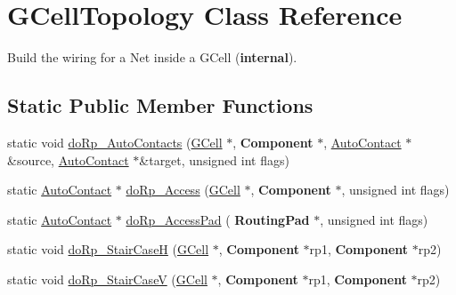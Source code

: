 \hypertarget{classanonymous__namespace_02LoadGrByNet_8cpp_03_1_1GCellTopology}{}\section{G\+Cell\+Topology Class Reference}
\label{classanonymous__namespace_02LoadGrByNet_8cpp_03_1_1GCellTopology}


Build the wiring for a Net inside a G\+Cell ({\bfseries internal}).  


\subsection*{Static Public Member Functions}
\begin{DoxyCompactItemize}
\item 
static void \mbox{\hyperlink{group__LoadGlobalRouting_gae9cae408ea16a3f7c77c3d75f0242f19}{do\+Rp\+\_\+\+Auto\+Contacts}} (\mbox{\hyperlink{classKatabatic_1_1GCell}{G\+Cell}} $\ast$, \textbf{ Component} $\ast$, \mbox{\hyperlink{classKatabatic_1_1AutoContact}{Auto\+Contact}} $\ast$\&source, \mbox{\hyperlink{classKatabatic_1_1AutoContact}{Auto\+Contact}} $\ast$\&target, unsigned int flags)
\item 
static \mbox{\hyperlink{classKatabatic_1_1AutoContact}{Auto\+Contact}} $\ast$ \mbox{\hyperlink{group__LoadGlobalRouting_gada6d3c694b8d741b6504b7c3da166357}{do\+Rp\+\_\+\+Access}} (\mbox{\hyperlink{classKatabatic_1_1GCell}{G\+Cell}} $\ast$, \textbf{ Component} $\ast$, unsigned int flags)
\item 
static \mbox{\hyperlink{classKatabatic_1_1AutoContact}{Auto\+Contact}} $\ast$ \mbox{\hyperlink{group__LoadGlobalRouting_ga60edeea78b56db072fc26a58a7afbcd4}{do\+Rp\+\_\+\+Access\+Pad}} (\textbf{ Routing\+Pad} $\ast$, unsigned int flags)
\item 
static void \mbox{\hyperlink{group__LoadGlobalRouting_ga3291d84592215974fe4052c00304bdb1}{do\+Rp\+\_\+\+Stair\+CaseH}} (\mbox{\hyperlink{classKatabatic_1_1GCell}{G\+Cell}} $\ast$, \textbf{ Component} $\ast$rp1, \textbf{ Component} $\ast$rp2)
\item 
static void \mbox{\hyperlink{group__LoadGlobalRouting_ga6361fb0e90f35cd59063a1ee971ef2a9}{do\+Rp\+\_\+\+Stair\+CaseV}} (\mbox{\hyperlink{classKatabatic_1_1GCell}{G\+Cell}} $\ast$, \textbf{ Component} $\ast$rp1, \textbf{ Component} $\ast$rp2)
\end{DoxyCompactItemize}
